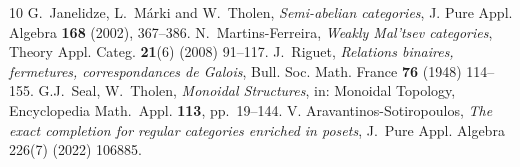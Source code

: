 \documentclass[10pt,a4paper]{amsart}
\theoremstyle{plain}
\theoremstyle{definition}
\theoremstyle{remark}
\begin{document}
\begin{thebibliography}{10}
 G.~Janelidze, L.~M\'arki and W.~Tholen, \emph{Semi-abelian categories}, J. Pure Appl. Algebra \textbf{168} (2002), 367--386.
 N.~Martins-Ferreira, \emph{Weakly Mal'tsev categories}, Theory Appl. Categ. \textbf{21}(6) (2008) 91--117.
 J.~Riguet, \emph{Relations binaires, fermetures, correspondances de Galois}, Bull. Soc. Math. France \textbf{76} (1948) 114--155.
 G.J.~Seal, W.~Tholen, \emph{Monoidal Structures}, in: Monoidal Topology, Encyclopedia Math.~Appl. \textbf{113}, pp.~19--144.
 V. Aravantinos-Sotiropoulos, \emph{The exact completion for regular categories enriched in posets}, {J.~Pure} Appl. Algebra 226(7) (2022) 106885.


\end{thebibliography}
\end{document}

